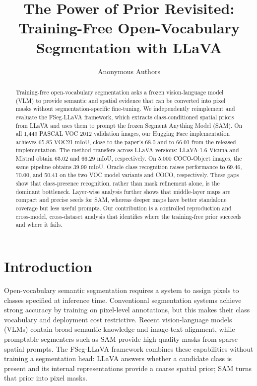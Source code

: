 \documentclass{article}
\title{The Power of Prior Revisited:\\
Training-Free Open-Vocabulary Segmentation with LLaVA}
\author{Anonymous Authors}
\newcommand{\method}{FSeg-LLaVA}
\newcommand{\miou}{mIoU}
\begin{document}
\maketitle

\begin{abstract}
Training-free open-vocabulary segmentation asks a frozen vision-language model (VLM) to provide
semantic and spatial evidence that can be converted into pixel masks without segmentation-specific
fine-tuning. We independently reimplement and evaluate the \method{} framework, which extracts
class-conditioned spatial priors from LLaVA and uses them to prompt the frozen Segment Anything
Model (SAM). On all 1,449 PASCAL VOC 2012 validation images, our Hugging Face implementation
achieves 65.85 VOC21 \miou{}, close to the paper's 68.0 and to 66.01 from the released
implementation. The method transfers across LLaVA versions: LLaVA-1.6 Vicuna and Mistral obtain
65.02 and 66.29 \miou{}, respectively. On 5,000 COCO-Object images, the same pipeline obtains
39.99 \miou{}. Oracle class recognition raises performance to 69.46, 70.00, and 50.41 on the
two VOC model variants and COCO, respectively. These gaps show that class-presence recognition,
rather than mask refinement alone, is the dominant bottleneck. Layer-wise analysis further shows
that middle-layer maps are compact and precise seeds for SAM, whereas deeper maps have better
standalone coverage but less useful prompts. Our contribution is a controlled reproduction and
cross-model, cross-dataset analysis that identifies where the training-free prior succeeds and
where it fails.
\end{abstract}

\section{Introduction}
\label{sec:introduction}
Open-vocabulary semantic segmentation requires a system to assign pixels to classes specified at
inference time. Conventional segmentation systems achieve strong accuracy by training on
pixel-level annotations, but this makes their class vocabulary and deployment cost restrictive.
Recent vision-language models (VLMs) contain broad semantic knowledge and image-text alignment,
while promptable segmenters such as SAM provide high-quality masks from sparse spatial prompts.
The \method{} framework combines these capabilities without training a segmentation head:
LLaVA answers whether a candidate class is present and its internal representations provide a
coarse spatial prior; SAM turns that prior into pixel masks.
\end{document}
